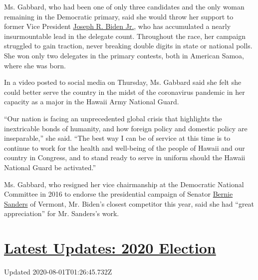Ms. Gabbard, who had been one of only three candidates and the only
woman remaining in the Democratic primary, said she would throw her
support to former Vice President
\href{https://www.nytimes.com/interactive/2020/us/elections/joe-biden.html}{Joseph
R. Biden Jr.}, who has accumulated a nearly insurmountable lead in the
delegate count. Throughout the race, her campaign struggled to gain
traction, never breaking double digits in state or national polls. She
won only two delegates in the primary contests, both in American Samoa,
where she was born.

In a video posted to social media on Thursday, Ms. Gabbard said she felt
she could better serve the country in the midst of the coronavirus
pandemic in her capacity as a major in the Hawaii Army National Guard.

``Our nation is facing an unprecedented global crisis that highlights
the inextricable bonds of humanity, and how foreign policy and domestic
policy are inseparable,'' she said. ``The best way I can be of service
at this time is to continue to work for the health and well-being of the
people of Hawaii and our country in Congress, and to stand ready to
serve in uniform should the Hawaii National Guard be activated.''

Ms. Gabbard, who resigned her vice chairmanship at the Democratic
National Committee in 2016 to endorse the presidential campaign of
Senator
\href{https://www.nytimes.com/interactive/2020/us/elections/bernie-sanders.html}{Bernie
Sanders} of Vermont, Mr. Biden's closest competitor this year, said she
had ``great appreciation'' for Mr. Sanders's work.

\hypertarget{latest-updates-2020-election}{%
\section{\texorpdfstring{\href{https://www.nytimes.com/2020/07/31/us/elections/biden-vs-trump.html?action=click\&pgtype=Article\&state=default\&region=MAIN_CONTENT_1\&context=storylines_live_updates}{Latest
Updates: 2020
Election}}{Latest Updates: 2020 Election}}\label{latest-updates-2020-election}}

Updated 2020-08-01T01:26:45.732Z

